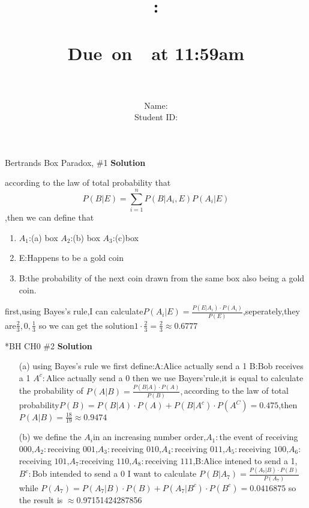 \documentclass{article}
\title{
    \vspace{2in}
    \textmd{\textbf{\hmwkClass:\\  \hmwkTitle}}\\
    \normalsize\vspace{0.1in}\small{Due\ on\ \hmwkDueDate\ at 11:59am}\\
   \vspace{2in}\Huge{\hmwkClassID}\\   
   \vspace{2in}
}
\author{
	Name: \textbf{\hmwkAuthorName} \\
	Student ID: \hmwkAuthorID}
\date{}
\newcommand{\solution}{\textbf{\Large Solution}}
\begin{document}
\maketitle
\pagebreak

\begin{homeworkProblem}{{\color{blue} Bertrands Box Paradox}, \#1}
\solution\\
{\LARGE
according to the law of total probability that $$P(B|E)=\sum_{i=1}^{n}P(B|A_i,E)P(A_i|E)$$
,then we can define that
\begin{enumerate}
	\item $A_1$:(a) box $A_2$:(b) box $A_3$:(c)box
	\item E:Happens to be a gold coin
	\item B:the probability of the next coin drawn from the same box also being a gold coin.

\end{enumerate}
first,using Bayes's rule,I can calculate$P(A_i|E)=\frac{P(E|A_i)\cdot P(A_i)}{P(E)}$,seperately,they are$\frac{2}{3},0,\frac{1}{3}$
so we can get the solution$1\cdot \frac{2}{3} =\frac{2}{3}\approx 0.6777$
}
\end{homeworkProblem}

\begin{homeworkProblem}*{BH CH0 \#2}
\solution
\\{\large
\begin{enumerate}
	\item[(a)]using Bayes's rule we first define:A:Alice actually send a 1 B:Bob receives a 1 $A^c:$Alice actually send a 0
then we use Bayers'rule,it is equal to calculate the probability of $P(A|B)=\frac{P(B|A)\cdot P(A)}{P(B)},$according to the law of total probability$P(B)=P(B|A)\cdot P(A)+P(B|A^c)\cdot P(A^C)=0.475$,then $P(A|B)=\frac{18}{19}\approx 0.9474$
	\item[(b)]  we define the $A_i$in an increasing number order,$A_1:$the event of receiving $000$,$A_2:$receiving $001$,$A_3:$receiving $010$,$A_4:$receiving $011$,$A_5:$receiving $100$,$A_6:$receiving $101$,$A_7$:receiving $110$,$A_8:$receiving $111$,B:Alice intened to send a 1,$B^c:$Bob intended to send a 0
I want to calculate $P(B|A_7)=\frac{P(A_7|B)\cdot P(B)}{P(A_7)}$ while $P(A_7)=P(A_7|B)\cdot P(B)+P(A_7|B^c)\cdot P(B^c)=0.0416875$ so the result is $\approx$0.97151424287856
\end{enumerate}

}
\end{homeworkProblem}
\end{document}
